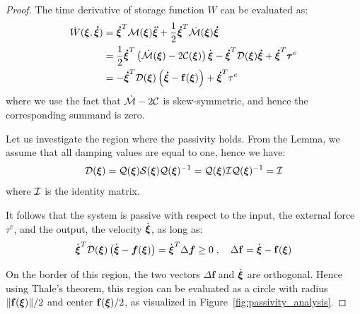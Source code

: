 \begin{proof}
The time derivative of storage function $W$ can be evaluated as:
\begin{align}
    \dot W(\boldsymbol{\xi}, \boldsymbol{\dot \xi}) &=
    \boldsymbol{\dot \xi}^T \mathcal{M}(\boldsymbol{\xi}) \boldsymbol{\ddot \xi}  + \frac{1}{2} \boldsymbol{\dot \xi}^T \dot{\mathcal{M}}(\boldsymbol{\xi}) \boldsymbol{\dot \xi}  \nonumber \\
  &= \frac{1}{2} \boldsymbol{\dot \xi}^T \left( \dot{\mathcal{M}}(\boldsymbol{\xi}) - 2 \mathcal{C}(\boldsymbol{\xi}) \right) \dot{\boldsymbol{\xi}} - \boldsymbol{\dot \xi}^T \mathcal{D}(\boldsymbol{\xi}) \boldsymbol{\dot \xi} + \boldsymbol{\dot \xi}^T \boldsymbol{\tau}^e \nonumber \\
  &= - \boldsymbol{\dot \xi}^T \mathcal{D}(\boldsymbol{\xi}) \left( \boldsymbol{\dot\xi} - \mathbf{f}(\boldsymbol{\xi}) \right) + \boldsymbol{\dot\xi}^T \tau^e
\end{align}
where we use the fact that $\dot{\mathcal{M}} - 2 \mathcal{C}$ is skew-symmetric, and hence the corresponding summand is zero.

Let us investigate the region where the passivity holds. From the Lemma, we assume that all damping values are equal to one, hence we have:
\begin{equation}
	\mathcal{D}({\boldsymbol{\xi}}) = \mathcal{Q}({\boldsymbol{\xi}}) \mathcal{S} ({\boldsymbol{\xi}}) \mathcal{Q}({\boldsymbol{\xi}})^{-1}= \mathcal{Q}({\boldsymbol{\xi}}) \mathcal{I} \mathcal{Q}({\boldsymbol{\xi}})^{-1} = \mathcal{I}
\end{equation}
where $\mathcal{I}$ is the identity matrix.

It follows that the system is passive with respect to the input, the external force $\tau^e$, and the output, the velocity $\dot {\boldsymbol{\xi}}$, as long as:
\begin{equation}
	\dot{\boldsymbol {\boldsymbol{\xi}}}^T \mathcal{D}({\boldsymbol{\xi}}) \left(\dot{\boldsymbol {\boldsymbol{\xi}}} - \boldsymbol{f}(\boldsymbol {\boldsymbol{\xi}}) \right) = 
    \dot{{\boldsymbol{\xi}}} ^ T \Delta \boldsymbol{f}  \geq 0 
 \; , \quad
 \Delta \mathbf{f} = \dot{{\boldsymbol{\xi}}} - \mathbf{f}({\boldsymbol{\xi}})
\end{equation}

On the border of this region, the two vectors $\Delta \mathbf{f}$ and $\dot{\mathbf {\boldsymbol{\xi}}}$ are orthogonal.
Hence using Thale's theorem, this region can be evaluated as a circle with radius $\| \mathbf{f} ({\boldsymbol{\xi}}) \| / 2$ and center $\mathbf{f}(\mathbf {\boldsymbol{\xi}}) / 2$, as visualized in Figure~\ref{fig:passivity_analysis}.


\end{proof}
